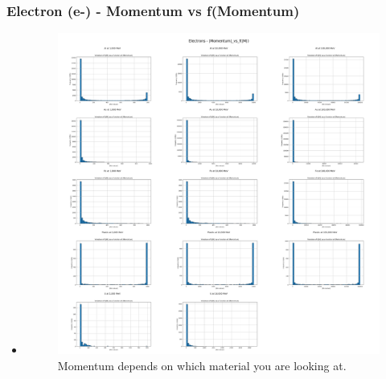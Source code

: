 \documentclass[aspectratio-169]{beamer}
\begin{document}
\begin{frame}
\frametitle{Electron (e-) - Momentum vs f(Momentum)}
\begin{itemize}
    \item 
    \begin{minipage}{0.5\textwidth}
        \begin{figure}
            \centering
            \includegraphics[width=\textwidth]{Combined Plots/|Momentum|_vs_f(|M|)_e-.png}
            \footnotesize{Momentum depends on which material you are looking at.}
        \end{figure}
    \end{minipage}
\end{itemize}
\end{frame}

\end{document}
